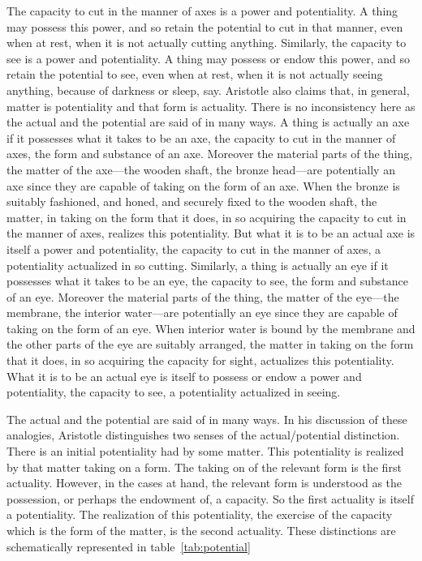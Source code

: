 The capacity to cut in the manner of axes is a power and potentiality. A thing may possess this power, and so retain the potential to cut in that manner, even when at rest, when it is not actually cutting anything. Similarly, the capacity to see is a power and potentiality. A thing may possess or endow this power, and so retain the potential to see, even when at rest, when it is not actually seeing anything, because of darkness or sleep, say. Aristotle also claims that, in general, matter is potentiality and that form is actuality. There is no inconsistency here as the actual and the potential are said of in many ways. A thing is actually an axe if it possesses what it takes to be an axe, the capacity to cut in the manner of axes, the form and substance of an axe. Moreover the material parts of the thing, the matter of the axe---the wooden shaft, the bronze head---are potentially an axe since they are capable of taking on the form of an axe. When the bronze is suitably fashioned, and honed, and securely fixed to the wooden shaft, the matter, in taking on the form that it does, in so acquiring the capacity to cut in the manner of axes, realizes this potentiality. But what it is to be an actual axe is itself a power and potentiality, the capacity to cut in the manner of axes, a potentiality actualized in so cutting. Similarly, a thing is actually an eye if it possesses what it takes to be an eye, the capacity to see, the form and substance of an eye. Moreover the material parts of the thing, the matter of the eye---the membrane, the interior water---are potentially an eye since they are capable of taking on the form of an eye. When interior water is bound by the membrane and the other parts of the eye are suitably arranged, the matter in taking on the form that it does, in so acquiring the capacity for sight, actualizes this potentiality. What it is to be an actual eye is itself to possess or endow a power and potentiality, the capacity to see, a potentiality actualized in seeing.

The actual and the potential are said of in many ways. In his discussion of these analogies, Aristotle distinguishes two senses of the actual/potential distinction. There is an initial potentiality had by some matter. This potentiality is realized by that matter taking on a form. The taking on of the relevant form is the first actuality. However, in the cases at hand, the relevant form is understood as the possession, or perhaps the endowment of, a capacity. So the first actuality is itself a potentiality. The realization of this potentiality, the exercise of the capacity which is the form of the matter, is the second actuality. These distinctions are schematically represented in table~\ref{tab:potential}

